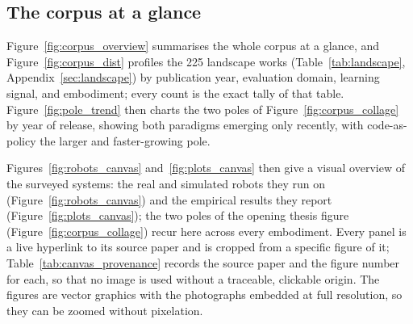 

\subsection{The corpus at a glance}
\label{sec:corpus_gallery}

Figure~\ref{fig:corpus_overview} summarises the whole corpus at a glance, and
Figure~\ref{fig:corpus_dist} profiles the 225 landscape works (Table~\ref{tab:landscape},
Appendix~\ref{sec:landscape}) by publication year, evaluation domain, learning signal, and
embodiment; every count is the exact tally of that table. Figure~\ref{fig:pole_trend} then charts the
two poles of Figure~\ref{fig:corpus_collage} by year of release, showing both paradigms emerging only
recently, with code-as-policy the larger and faster-growing pole.

Figures~\ref{fig:robots_canvas} and~\ref{fig:plots_canvas} then give a visual overview of the surveyed
systems: the real and simulated robots they run on (Figure~\ref{fig:robots_canvas}) and the empirical
results they report (Figure~\ref{fig:plots_canvas}); the two poles of the opening thesis figure
(Figure~\ref{fig:corpus_collage}) recur here across every embodiment. Every panel is a live hyperlink
to its source paper and is cropped from a specific figure of it; Table~\ref{tab:canvas_provenance}
records the source paper and the figure number for each, so that no image is used without a
traceable, clickable origin. The figures are vector graphics with the photographs embedded at full
resolution, so they can be zoomed without pixelation.






